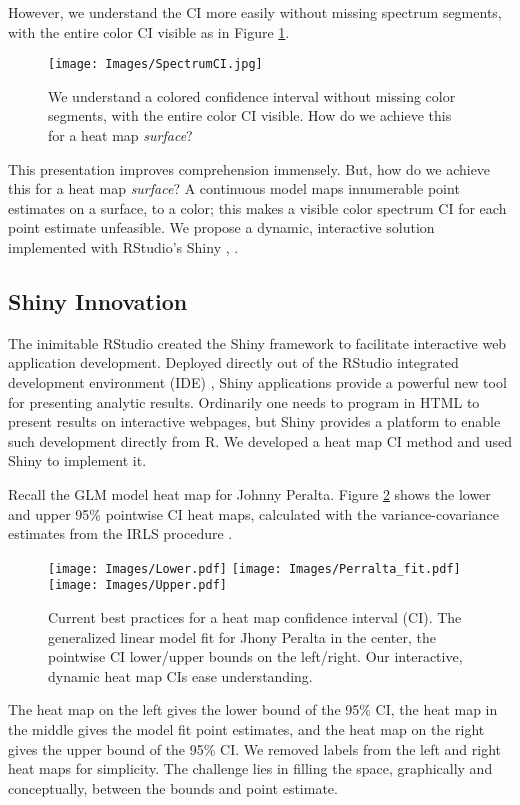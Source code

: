 However, we understand the CI more easily without missing spectrum segments, with the entire color CI visible as in Figure \ref{fig:specint}.
  \begin{figure}[H]
  \centering
	\texttt{[image: Images/SpectrumCI.jpg]}
	\caption{We understand a colored confidence interval without missing color segments, with the entire color CI visible. How do we achieve this for a heat map {\it surface}?}
	\label{fig:specint}
	\end{figure}
This presentation improves comprehension immensely. But, how do we achieve this for a heat map {\it surface}? A continuous model maps innumerable point estimates on a surface, to a color; this makes a visible color spectrum CI for each point estimate unfeasible. We propose a dynamic, interactive solution implemented with RStudio's Shiny \citep{Shiny}, \citep{RStudio}.

\subsection{Shiny Innovation}
The inimitable RStudio created the Shiny framework to facilitate interactive web application development. Deployed directly out of the RStudio integrated development environment (IDE) \citep{IDE}, Shiny applications provide a powerful new tool for presenting analytic results. Ordinarily one needs to program in HTML to present results on interactive webpages, but Shiny provides a platform to enable such development directly from R. We developed a heat map CI method and used Shiny to implement it.

Recall the GLM model heat map for Johnny Peralta. Figure \ref{fig:LPU} shows the lower and upper 95\% pointwise CI heat maps, calculated with the variance-covariance estimates from the IRLS procedure \citep{Myers2012}.
  \begin{figure}[H]
	\centering
	\texttt{[image: Images/Lower.pdf]}
	\texttt{[image: Images/Perralta\_fit.pdf]}
	\texttt{[image: Images/Upper.pdf]}
	\caption{Current best practices for a heat map confidence interval (CI). The generalized linear model fit for Jhony Peralta in the center, the pointwise CI lower/upper bounds on the left/right. Our interactive, dynamic heat map CIs ease understanding.}
	\label{fig:LPU}
	\end{figure}
The heat map on the left gives the lower bound of the 95\% CI, the heat map in the middle gives the model fit point estimates, and the heat map on the right gives the upper bound of the 95\% CI. We removed labels from the left and right heat maps for simplicity. The challenge lies in filling the space, graphically and conceptually, between the bounds and point estimate. 

